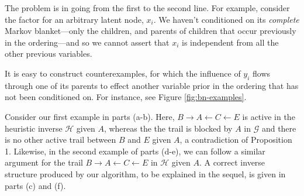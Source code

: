 The problem is in going from the first to the second line. 
For example, consider the factor for an arbitrary latent node, $x_i$. 
We haven't conditioned on its \emph{complete} Markov blanket---only the children, and parents of children that occur previously in the ordering---and so we cannot assert that $x_i$ is independent from all the other previous variables.

It is easy to construct counterexamples, for which the influence of $y_i$ flows through one of its parents to effect another variable prior in the ordering that has not been conditioned on. 
For instance, see Figure \ref{fig:bn-examples}.



Consider our first example in parts (a-b). 
Here, $B\rightarrow A\leftarrow C\leftarrow E$ is active in the heuristic inverse $\mathcal{H}$ given $A$, whereas the the trail is blocked by $A$ in $\mathcal{G}$ and there is no other active trail between $B$ and $E$ given $A$, a contradiction of Proposition 1. 
Likewise, in the second example of parts (d-e), we can follow a similar argument for the trail $B\rightarrow A\leftarrow C\leftarrow E$ in $\mathcal{H}$ given $A$. 
A correct inverse structure produced by our algorithm, to be explained in the sequel, is given in parts (c) and (f).
